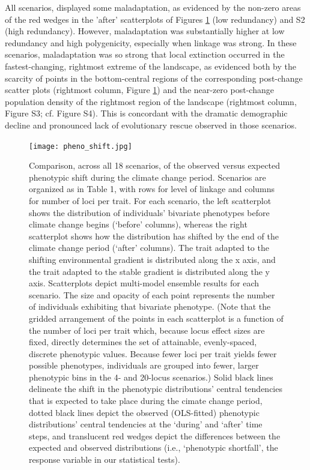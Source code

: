 \documentclass[9pt,twocolumn,twoside,lineno]{pnas-new}
\begin{document}
All scenarios, displayed some maladaptation, as evidenced by the non-zero areas of the red wedges
in the 'after' scatterplots of Figures \ref{fig:pheno_shift} (low redundancy) and S2 (high redundancy).
However, maladaptation was substantially higher at low redundancy and high polygenicity,
especially when linkage was strong. 
In these scenarios, maladaptation was so strong that local extinction occurred
in the fastest-changing, rightmost extreme of the landscape,
as evidenced both by the scarcity of points in the bottom-central regions
of the corresponding post-change scatter plots (rightmost column, Figure \ref{fig:pheno_shift})
and the near-zero post-change population density of the rightmost region of the landscape
(rightmost column, Figure S3; cf. Figure S4).
This is concordant with the dramatic demographic decline and pronounced lack of evolutionary rescue
observed in those scenarios.

\begin{figure}
\centering
\texttt{[image: pheno\_shift.jpg]}
\caption{Comparison, across all 18 scenarios, of the observed versus expected phenotypic shift during the climate change period. Scenarios are organized as in Table 1, with rows for level of linkage and columns for number of loci per trait. For each scenario, the left scatterplot shows the distribution of individuals’ bivariate phenotypes before climate change begins (‘before’ columns), whereas the right scatterplot shows how the distribution has shifted by the end of the climate change period (‘after’ columns). The trait adapted to the shifting environmental gradient is distributed along the x axis, and the trait adapted to the stable gradient is distributed along the y axis. Scatterplots depict multi-model ensemble results for each scenario. The size and opacity of each point represents the number of individuals exhibiting that bivariate phenotype. (Note that the gridded arrangement of the points in each scatterplot is a function of the number of loci per trait which, because locus effect sizes are fixed, directly determines the set of attainable, evenly-spaced, discrete phenotypic values. Because fewer loci per trait yields fewer possible phenotypes, individuals are grouped into fewer, larger phenotypic bins in the 4- and 20-locus scenarios.) Solid black lines delineate the shift in the phenotypic distributions’ central tendencies that is expected to take place during the cimate change period, dotted black lines depict the observed (OLS-fitted) phenotypic distributions’ central tendencies at the ‘during’ and ‘after’ time steps, and translucent red wedges depict the differences between the expected and observed distributions (i.e., ‘phenotypic shortfall’, the response variable in our statistical tests).
}
\label{fig:pheno_shift}
\end{figure}
\end{document}
